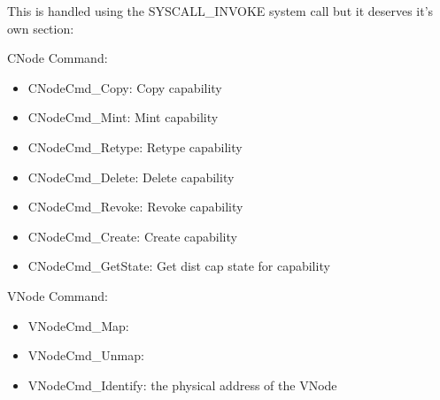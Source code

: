 \documentclass[a4paper,11pt,twoside]{report}
\begin{document}
{{This is handled using the SYSCALL\_INVOKE system call but it deserves
it's own section:

CNode Command:
\begin{itemize}
\item CNodeCmd\_Copy: Copy capability
\item CNodeCmd\_Mint: Mint capability
\item CNodeCmd\_Retype: Retype capability
\item CNodeCmd\_Delete: Delete capability
\item CNodeCmd\_Revoke: Revoke capability
\item CNodeCmd\_Create: Create capability
\item CNodeCmd\_GetState: Get dist cap state for capability
\end{itemize}

VNode Command:
\begin{itemize}
\item VNodeCmd\_Map:
\item VNodeCmd\_Unmap:
\item VNodeCmd\_Identify: the physical address of the VNode
\end{itemize}

}}
\end{document}
